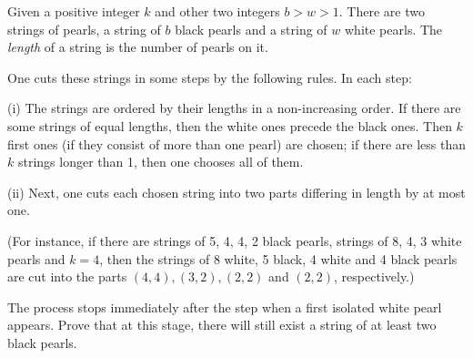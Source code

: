 Given a positive integer $k$ and other two integers $b > w > 1$. There are two strings of pearls, a string of $b$ black pearls and a string of $w$ white pearls. The \emph{length} of a string is the number of pearls on it.

One cuts these strings in some steps by the following rules. In each step:

(i) The strings are ordered by their lengths in a non-increasing order. If there are some strings of equal lengths, then the white ones precede the black ones. Then $k$ first ones (if they consist of more than one pearl) are chosen; if there are less than $k$ strings longer than 1, then one chooses all of them.

(ii) Next, one cuts each chosen string into two parts differing in length by at most one.

(For instance, if there are strings of 5, 4, 4, 2 black pearls, strings of 8, 4, 3 white pearls and $k = 4$, then the strings of 8 white, 5 black, 4 white and 4 black pearls are cut into the parts $(4, 4), (3, 2), (2, 2)$ and $(2, 2)$, respectively.)

The process stops immediately after the step when a first isolated white pearl appears. Prove that at this stage, there will still exist a string of at least two black pearls.
